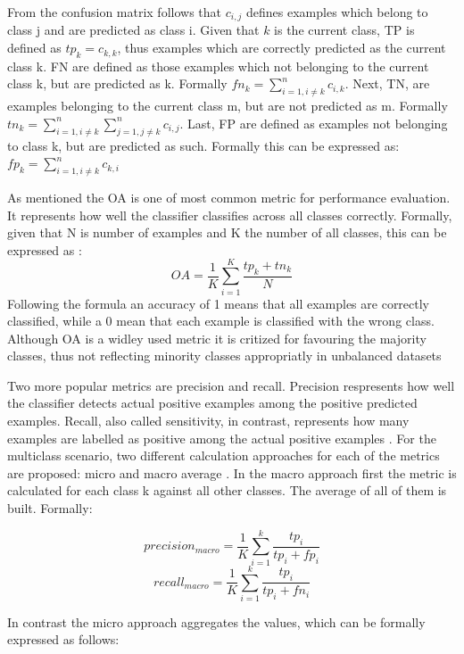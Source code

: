 \documentclass[12pt, a4paper, titlepage]{article}
\begin{document}
From the confusion matrix follows that $c_{i, j}$ defines examples which belong to class j and are predicted as class i. Given that $k$ is the current class, \ac{TP} is defined as $tp_{k} = c_{k, k}$, thus examples which are correctly predicted as the current class k. \ac{FN} are defined as those examples which not belonging to the current class k, but are predicted as k. Formally $fn_{k} = \sum_{i=1, i \neq k}^n c_{i, k}$. Next, \ac{TN}, are examples belonging to the current class m, but are not predicted as m. Formally $tn_{k} = \sum_{i=1, i\neq k}^n \sum_{j=1, j \neq k}^n c_{i,j}$. Last, \ac{FP} are defined as examples not belonging to class k, but are predicted as such. Formally this can be expressed as: $fp_{k} =  \sum_{i=1, i \neq k}^n c_{k, i}$ \citep{Kautz2017}

As mentioned the \ac{OA} is one of most common metric for performance evaluation. It represents how well the classifier classifies across all classes correctly. Formally, given that N is number of examples and K the number of all classes, this can be expressed as \citep{Branco2017}: 
\[OA = \frac{1}{K} \sum_{i = 1}^K \frac{tp_{k} + tn_{k}}{N}\]
Following the formula an accuracy of 1 means that all examples are correctly classified, while a 0 mean that each example is classified with the wrong class. \citep{Berthold2020}
Although \ac{OA} is a widley used metric it is critized for favouring the majority classes, thus not reflecting minority classes appropriatly in unbalanced datasets \citep{Berthold2020, Fatourechi2008}

Two more popular metrics are precision and recall. Precision respresents how well the classifier detects actual positive examples among the positive predicted examples. Recall, also called sensitivity, in contrast, represents how many examples are labelled as positive among the actual positive examples \citep{Berthold2020}. For the multiclass scenario, two different calculation approaches for each of the metrics are proposed: micro and macro average \citep{Branco2017}. In the macro approach first the metric is calculated for each class k against all other classes. The average of all of them is built. Formally: 

\[precision_{macro} = \frac{1}{K} \sum_{i=1}^k \frac{tp_{i}}{tp_{i} + fp_{i}}\]
\[recall_{macro} = \frac{1}{K} \sum_{i=1}^k \frac{tp_{i}}{tp_{i} + fn_{i}}\]

In contrast the micro approach aggregates the values, which can be formally expressed as follows: 
\end{document}
